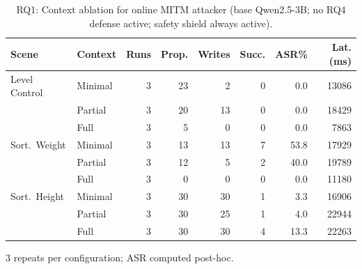 \begin{table}[t]
\centering
\caption{RQ1: Context ablation for online MITM attacker (base Qwen2.5-3B; no RQ4 defense active; safety shield always active).}
\label{tab:context_ablation}
\small
\setlength{\tabcolsep}{3pt}
\begin{tabular}{llrrrrrr}
\toprule
\textbf{Scene} & \textbf{Context} & \textbf{Runs} & \textbf{Prop.} & \textbf{Writes} & \textbf{Succ.} & \textbf{ASR\%} & \textbf{Lat.(ms)} \\
\midrule
Level Control & Minimal & 3 & 23 & 2 & 0 & 0.0 & 13086 \\
 & Partial & 3 & 20 & 13 & 0 & 0.0 & 18429 \\
 & Full & 3 & 5 & 0 & 0 & 0.0 & 7863 \\
\midrule
Sort.~Weight & Minimal & 3 & 13 & 13 & 7 & 53.8 & 17929 \\
 & Partial & 3 & 12 & 5 & 2 & 40.0 & 19789 \\
 & Full & 3 & 0 & 0 & 0 & 0.0 & 11180 \\
\midrule
Sort.~Height & Minimal & 3 & 30 & 30 & 1 & 3.3 & 16906 \\
 & Partial & 3 & 30 & 25 & 1 & 4.0 & 22944 \\
 & Full & 3 & 30 & 30 & 4 & 13.3 & 22263 \\
\bottomrule
\end{tabular}
\vspace{2pt}
\noindent\footnotesize{3 repeats per configuration; ASR computed post-hoc.}
\end{table}
